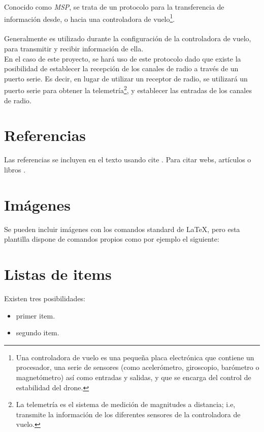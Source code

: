 \noindent Conocido como \textit{MSP}, se trata de un protocolo para la transferencia de información desde, o hacia una controladora de vuelo\footnote{Una controladora de vuelo es una pequeña placa electrónica que contiene un procesador, una serie de sensores (como acelerómetro, giroscopio, barómetro o magnetómetro) así como entradas y salidas, y que se encarga del control de estabilidad del drone.}.\\\\Generalmente es utilizado durante la configuración de la controladora de vuelo, para transmitir y recibir información de ella.
\\En el caso de este proyecto, se hará uso de este protocolo dado que existe la posibilidad de establecer la recepción de los canales de radio a través de un puerto serie. Es decir, en lugar de utilizar un receptor de radio, se utilizará un puerto serie para obtener la telemetría\footnote{La telemetría es el sistema de medición de magnitudes a distancia; i.e, transmite la información de los diferentes sensores de la controladora de vuelo. }, y establecer las entradas de los canales de radio.


\section{Referencias}

Las referencias se incluyen en el texto usando cite \cite{wiki:latex}. Para citar webs, artículos o libros \cite{koza92}.


\section{Imágenes}

Se pueden incluir imágenes con los comandos standard de \LaTeX, pero esta plantilla dispone de comandos propios como por ejemplo el siguiente:




\section{Listas de items}

Existen tres posibilidades:

\begin{itemize}
	\item primer item.
	\item segundo item.
\end{itemize}

